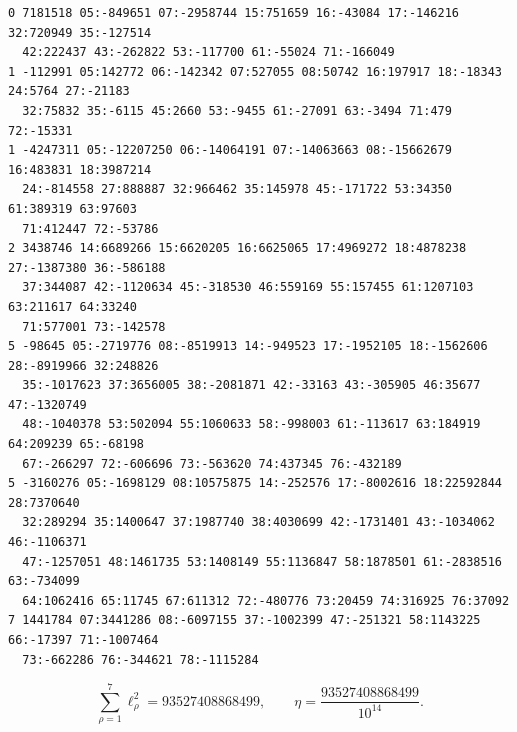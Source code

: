 \begingroup\scriptsize
\begin{verbatim}
0 7181518 05:-849651 07:-2958744 15:751659 16:-43084 17:-146216 32:720949 35:-127514
  42:222437 43:-262822 53:-117700 61:-55024 71:-166049
1 -112991 05:142772 06:-142342 07:527055 08:50742 16:197917 18:-18343 24:5764 27:-21183
  32:75832 35:-6115 45:2660 53:-9455 61:-27091 63:-3494 71:479 72:-15331
1 -4247311 05:-12207250 06:-14064191 07:-14063663 08:-15662679 16:483831 18:3987214
  24:-814558 27:888887 32:966462 35:145978 45:-171722 53:34350 61:389319 63:97603
  71:412447 72:-53786
2 3438746 14:6689266 15:6620205 16:6625065 17:4969272 18:4878238 27:-1387380 36:-586188
  37:344087 42:-1120634 45:-318530 46:559169 55:157455 61:1207103 63:211617 64:33240
  71:577001 73:-142578
5 -98645 05:-2719776 08:-8519913 14:-949523 17:-1952105 18:-1562606 28:-8919966 32:248826
  35:-1017623 37:3656005 38:-2081871 42:-33163 43:-305905 46:35677 47:-1320749
  48:-1040378 53:502094 55:1060633 58:-998003 61:-113617 63:184919 64:209239 65:-68198
  67:-266297 72:-606696 73:-563620 74:437345 76:-432189
5 -3160276 05:-1698129 08:10575875 14:-252576 17:-8002616 18:22592844 28:7370640
  32:289294 35:1400647 37:1987740 38:4030699 42:-1731401 43:-1034062 46:-1106371
  47:-1257051 48:1461735 53:1408149 55:1136847 58:1878501 61:-2838516 63:-734099
  64:1062416 65:11745 67:611312 72:-480776 73:20459 74:316925 76:37092
7 1441784 07:3441286 08:-6097155 37:-1002399 47:-251321 58:1143225 66:-17397 71:-1007464
  73:-662286 76:-344621 78:-1115284
\end{verbatim}
\endgroup

\begin{equation}
 \sum_{\rho=1}^{7}\ell_\rho^2=93527408868499,
 \qquad \eta=\frac{93527408868499}{10^{14}}.
 \label{eq:F-eta-arithmetic}
\end{equation}

\subsection{}
\label{app:F-three-arithmetic}

